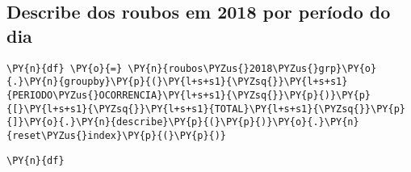     \hypertarget{describe-dos-roubos-em-2018-por-peruxedodo-do-dia}{%
\subsection*{Describe dos roubos em 2018 por período do
dia}\label{describe-dos-roubos-em-2018-por-peruxedodo-do-dia}}

    \begin{tcolorbox}[breakable, size=fbox, boxrule=1pt, pad at break*=1mm,colback=cellbackground, colframe=cellborder]
\begin{Verbatim}[commandchars=\\\{\}]
\PY{n}{df} \PY{o}{=} \PY{n}{roubos\PYZus{}2018\PYZus{}grp}\PY{o}{.}\PY{n}{groupby}\PY{p}{(}\PY{l+s+s1}{\PYZsq{}}\PY{l+s+s1}{PERIODO\PYZus{}OCORRENCIA}\PY{l+s+s1}{\PYZsq{}}\PY{p}{)}\PY{p}{[}\PY{l+s+s1}{\PYZsq{}}\PY{l+s+s1}{TOTAL}\PY{l+s+s1}{\PYZsq{}}\PY{p}{]}\PY{o}{.}\PY{n}{describe}\PY{p}{(}\PY{p}{)}\PY{o}{.}\PY{n}{reset\PYZus{}index}\PY{p}{(}\PY{p}{)}
\end{Verbatim}
\end{tcolorbox}

    \begin{tcolorbox}[breakable, size=fbox, boxrule=1pt, pad at break*=1mm,colback=cellbackground, colframe=cellborder]
\begin{Verbatim}[commandchars=\\\{\}]
\PY{n}{df}
\end{Verbatim}
\end{tcolorbox}

